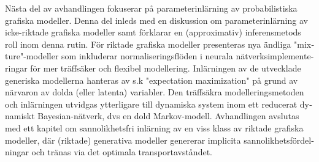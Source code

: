 \begin{otherlanguage}{swedish}
Nästa del av avhandlingen fokuserar på parameterinlärning av probabilistiska grafiska modeller. Denna del inleds med en diskussion om parameterinlärning av icke-riktade grafiska modeller samt förklarar en (approximativ) inferensmetods roll inom denna rutin. För riktade grafiska modeller presenteras nya ändliga "mixture"-modeller som inkluderar normaliseringsflöden i neurala nätverksimplementeringar för mer träffsäker och flexibel modellering. Inlärningen av de utvecklade generiska modellerna hanteras av s.k "expectation maximization" på grund av närvaron av dolda (eller latenta) variabler. Den träffsäkra modelleringsmetoden och inlärningen utvidgas ytterligare till dynamiska system inom ett reducerat dynamiskt Bayesian-nätverk, dvs en dold Markov-modell. Avhandlingen avslutas med ett kapitel om sannolikhetsfri inlärning av en viss klass av riktade grafiska modeller, där (riktade) generativa modeller genererar implicita sannolikhetsfördelningar och tränas via det optimala transportavståndet.
\end{otherlanguage}

